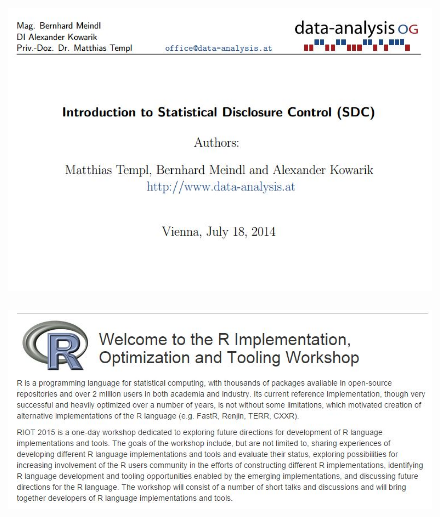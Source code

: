 \documentclass{beamer}
\begin{document}
\begin{frame}
	\begin{figure}
		\centering
		\includegraphics[width=1.11\linewidth]{sdcmicrocover}
		
	\end{figure}
	
\end{frame}
\begin{frame}
\begin{figure}
\centering
\includegraphics[width=1.11\linewidth]{riot}

\end{figure}

\end{frame}
\end{document}

